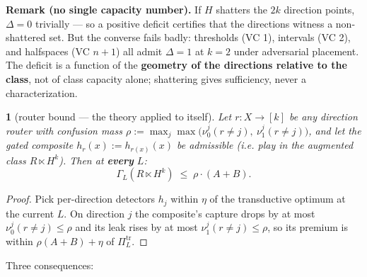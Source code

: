 \documentclass[11pt]{article}
\theoremstyle{plain}
\newtheorem*{namedthminner}{\namedthmname}
\newenvironment{nthm}[1]{\def\namedthmname{#1}\begin{namedthminner}}{\end{namedthminner}}
\theoremstyle{definition}
\begin{document}
\textbf{Remark (no single capacity number).} If $H$ shatters the $2k$ direction
points, $\Delta = 0$ trivially --- so a positive deficit certifies that the
directions witness a non-shattered set. But the converse fails badly:
thresholds (VC 1), intervals (VC 2), and halfspaces (VC $n{+}1$) all admit
$\Delta = 1$ at $k = 2$ under adversarial placement. The deficit is a
function of the \textbf{geometry of the directions relative to the class}, not of
class capacity alone; shattering gives sufficiency, never a characterization.

\begin{nthm}{Theorem R}[router bound --- the theory applied to itself]
Let
$r : X \to [k]$ be any \emph{direction router} with confusion mass
$\rho := \max_j \max\big(\nu_0^j(r \neq j),\ \nu_1^j(r \neq j)\big)$, and let
the gated composite $h_r(x) := h_{r(x)}(x)$ be admissible (i.e. play in the
augmented class $R \ltimes H^k$). Then at \textbf{every} $L$:
$$\Gamma_L(R \ltimes H^k) \;\leq\; \rho \cdot (A + B).$$
\end{nthm}

\begin{proof}
Pick per-direction detectors $h_j$ within $\eta$ of the transductive
optimum at the current $L$. On direction $j$ the composite's capture drops by
at most $\nu_0^j(r \neq j) \leq \rho$ and its leak rises by at most
$\nu_1^j(r \neq j) \leq \rho$, so its premium is within
$\rho(A + B) + \eta$ of $\Pi^{\mathrm{tr}}_L$.
\end{proof}

Three consequences:
\end{document}
